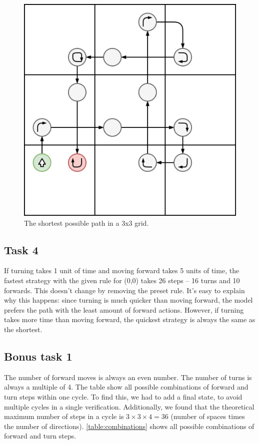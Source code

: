 \documentclass[11pt]{article}
\begin{document}
\begin{figure}[!htbp]
\centering
\includegraphics[scale=0.3]{vacuum3x3.png}
\caption{The shortest possible path in a 3x3 grid.}
\label{fig:vacuum3x3}
\end{figure}

\subsection*{Task 4}

If turning takes 1 unit of time and moving forward takes 5 units of time, the fastest strategy with the given rule for (0,0) takes 26 steps -- 16 turns and 10 forwards.
This doesn't change by removing the preset rule.
It's easy to explain why this happens: since turning is much quicker than moving forward, the model prefers the path with the least amount of forward actions.
However, if turning takes more time than moving forward, the quickest strategy is always the same as the shortest.

\subsection*{Bonus task 1}

The number of forward moves is always an even number.
The number of turns is always a multiple of 4.
The table show all possible combinations of forward and turn steps within one cycle.
To find this, we had to add a final state, to avoid multiple cycles in a single verification.
Additionally, we found that the theoretical maximum number of steps in a cycle is $3\times3\times4=36$ (number of spaces times the number of directions).
\autoref{table:combinations} shows all possible combinations of forward and turn steps.
\end{document}
